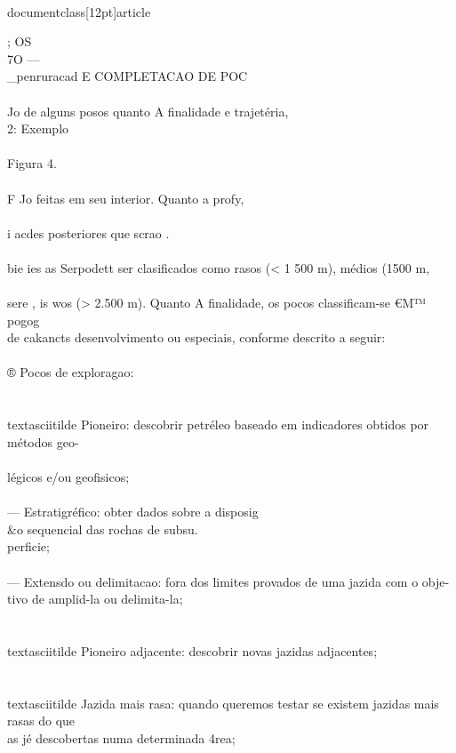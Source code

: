 \\documentclass[12pt]{article}
\begin{document}
{; OS\\
7O —\\_penruracad E COMPLETACAO DE POC\\
\\
Jo de alguns posos quanto A finalidade e trajetéria,\\
2: Exemplo\\
\\
Figura 4.\\
\\
F Jo feitas em seu interior. Quanto a profy,\\
\\
i acdes posteriores que scrao .\\
\\
bie ies as Serpodett ser clasificados como rasos (< 1 500 m), médios (1500 m,\\
\\
sere , is wos (> 2.500 m). Quanto A finalidade, os pocos classificam-se €M™ pogog\\
de cakancts desenvolvimento ou especiais, conforme descrito a seguir:\\
\\
® Pocos de exploragao:\\
\\
\\textasciitilde{} Pioneiro: descobrir petréleo baseado em indicadores obtidos por métodos geo-\\
\\
légicos e/ou geofisicos;\\
\\
— Estratigréfico: obter dados sobre a disposig\\&o sequencial das rochas de subsu.\\
perficie;\\
\\
— Extensdo ou delimitacao: fora dos limites provados de uma jazida com o obje-\\
tivo de amplid-la ou delimita-la;\\
\\
\\textasciitilde{} Pioneiro adjacente: descobrir novas jazidas adjacentes;\\
\\
\\textasciitilde{} Jazida mais rasa: quando queremos testar se existem jazidas mais rasas do que\\
as jé descobertas numa determinada 4rea;\\
\\
}
\end{document}
